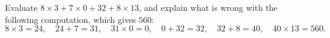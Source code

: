 Evaluate $8\times3+7\times0+32+8\times13$, and explain what is wrong with the following computation, which gives $560$:
\[8\times3=24,\quad24+7=31,\quad31\times0=0,\quad0+32=32,\quad32+8=40,\quad40\times13=560.\]
